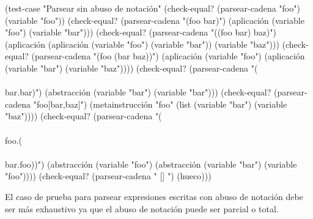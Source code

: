 \documentclass[10pt,oneside,openany,letterpaper]{book}
\begin{document}
\nwenddocs{}\plusendmoddef
(test-case "Parsear sin abuso de notación"
  (check-equal? (parsear-cadena "foo")
                (variable "foo"))
  (check-equal? (parsear-cadena "(foo bar)")
                (aplicación (variable "foo") (variable "bar")))
  (check-equal? (parsear-cadena "((foo bar) baz)")
                (aplicación (aplicación (variable "foo") (variable "bar"))
                            (variable "baz")))
  (check-equal? (parsear-cadena "(foo (bar baz))")
                (aplicación (variable "foo")
                            (aplicación (variable "bar") (variable "baz"))))
  (check-equal? (parsear-cadena "(\\\\bar.bar)")
                (abstracción (variable "bar") (variable "bar")))
  (check-equal? (parsear-cadena "foo[bar,baz]")
                (metainstrucción "foo" (list (variable "bar") (variable "baz"))))
  (check-equal? (parsear-cadena "(\\\\foo.(\\\\bar.foo))")
                (abstracción (variable "foo")
                             (abstracción (variable "bar") (variable "foo"))))
  (check-equal? (parsear-cadena "  []  ")
                (hueco)))
\nwendcode{}\nwdocspar

El caso de prueba para parsear expresiones escritas con abuso de notación debe ser más exhaustivo ya que el abuso de notación puede ser parcial o total.
\end{document}
